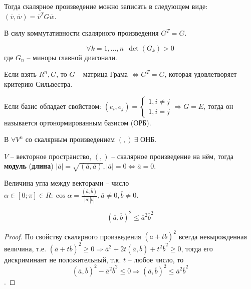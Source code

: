 	  Тогда скалярное произведение можно записать в следующем виде: $(\overline{v}, \overline{w}) = \overline{v}^T G \overline{w}$.
  
	  В силу коммутативности скалярного произведения $G^T = G$.
	  
	  \begin{Thm}
		 \[\forall k = 1,..., n \ \ \det(G_k) > 0\]
		 где $G_n$ -- миноры главной диагонали.
	  \end{Thm}
  
	  \begin{Prop}
		  Если взять $R^n, G$, то $G$ -- матрица Грама $\Leftrightarrow G^T = G$, которая удовлетворяет критерию Сильвестра.
	  \end{Prop}
  
	  \begin{Def}
		  Если базис обладает свойством:
		  $(e_i, e_j) = \begin{cases}
		  1, i \neq j\\
		  1, i = j
	  \end{cases} \Rightarrow G = E$,
	  тогда он называется ортонормированным базисом (ОРБ).
	  \end{Def} 
  
	  \begin{Thm}
		  В $\forall V^n$ со скалярным произведением $(,) \ \exists$ ОНБ. 
	  \end{Thm}
  
	  \begin{Def}
		  $V$ -- векторное пространство, $(,)$ -- скалярное произведение на нём, тогда \textbf{модуль} (\textbf{длина}) $|\overline{a}| = \sqrt{(\overline{a}, \overline{a})}, |\overline{a}| = 0 \Leftrightarrow \overline{a} = 0$.
	  \end{Def}
	  
	  \begin{Def}
		  Величина угла между векторами -- число $\alpha \in [0; \pi] \in R: \cos \alpha = \frac{(\overline{a}, \overline{b})}{|\overline{a}||\overline{b}|}, \overline{a} \neq 0, \overline{b} \neq 0$.
	  \end{Def}
  
	  \begin{Thm}
		  $$(\overline{a}, \overline{b})^2 \leqslant \overline{a}^2 \overline{b}^2$$
	  \end{Thm}
  
	  \begin{proof}
		  По свойству скалярного произведения $(\overline{a} + t\overline{b})^2$ всегда невырожденная величина, т.е. $(\overline{a} + t\overline{b})^2 \geqslant 0 \Rightarrow \overline{a}^2 + 2t(\overline{a}, \overline{b}) + t^2 \overline{b}^2 \geqslant 0$, 
		  тогда его дискриминант не положительный, т.к. $t$ -- любое число, то $$(\overline{a}, \overline{b})^2 - \overline{a}^2 \overline{b}^2 \leqslant 0 \Rightarrow (\overline{a}, \overline{b})^2 \leqslant \overline{a}^2 \overline{b}^2$$.
	  \end{proof}
  
